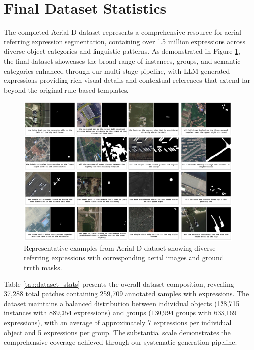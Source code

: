 \section{Final Dataset Statistics}

The completed Aerial-D dataset represents a comprehensive resource for aerial referring expression segmentation, containing over 1.5 million expressions across diverse object categories and linguistic patterns. As demonstrated in Figure \ref{fig:dataset_examples}, the final dataset showcases the broad range of instances, groups, and semantic categories enhanced through our multi-stage pipeline, with LLM-generated expressions providing rich visual details and contextual references that extend far beyond the original rule-based templates.

\begin{figure}[H]
\centering
\includegraphics[width=\textwidth]{Images/dataset.png}
\caption{Representative examples from Aerial-D dataset showing diverse referring expressions with corresponding aerial images and ground truth masks.}
\label{fig:dataset_examples}
\end{figure}

Table \ref{tab:dataset_stats} presents the overall dataset composition, revealing 37,288 total patches containing 259,709 annotated samples with expressions. The dataset maintains a balanced distribution between individual objects (128,715 instances with 889,354 expressions) and groups (130,994 groups with 633,169 expressions), with an average of approximately 7 expressions per individual object and 5 expressions per group. The substantial scale demonstrates the comprehensive coverage achieved through our systematic generation pipeline.

